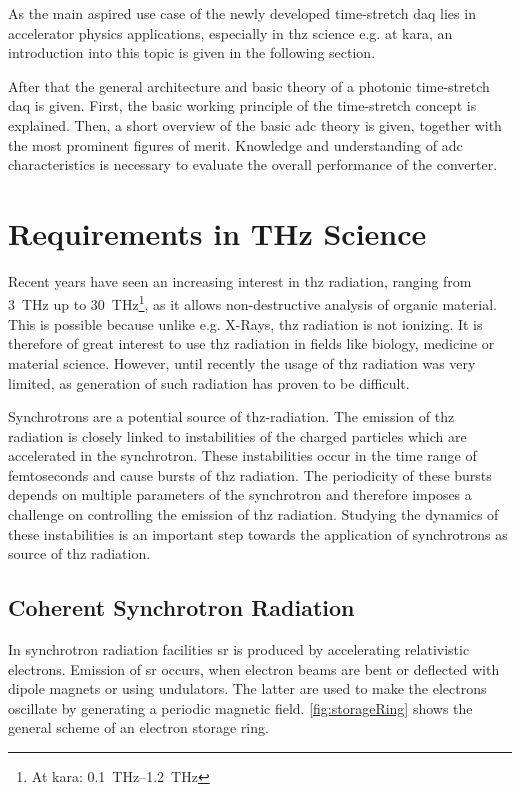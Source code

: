 As the main aspired use case of the newly developed time-stretch \gls{daq} lies in accelerator physics applications, especially in \gls{thz} science e.g. at \gls{kara}, an introduction into this topic is given in the following section. 

After that the general architecture and basic theory of a photonic time-stretch \gls{daq} is given.
First, the basic working principle of the time-stretch concept is explained.
Then, a short overview of the basic \gls{adc} theory is given, together with the most prominent figures of merit. 
Knowledge and understanding of \gls{adc} characteristics is necessary to evaluate the overall performance of the converter. 

\section{Requirements in THz Science}
Recent years have seen an increasing interest in \gls{thz} radiation, ranging from \SI{3}{\tera \hertz} up to \SI{30}{\tera \hertz}\footnote{At \gls{kara}: \SIrange{0.1}{1.2}{\tera \hertz}}, as it allows non-destructive analysis of organic material. 
This is possible because unlike e.g. X-Rays, \gls{thz} radiation is not ionizing.
It is therefore of great interest to use \gls{thz} radiation in fields like biology, medicine or material science.
However, until recently the usage of \gls{thz} radiation was very limited, as generation of such radiation has proven to be difficult.

Synchrotrons are a potential source of \gls{thz}-radiation. %
The emission of \gls{thz} radiation is closely linked to instabilities of the charged particles which are accelerated in the synchrotron. \cite{mueller2012}
These instabilities occur in the time range of femtoseconds and cause bursts of \gls{thz} radiation.
The periodicity of these bursts depends on multiple parameters of the synchrotron and therefore imposes a challenge on controlling the emission of \gls{thz} radiation.
Studying the dynamics of these instabilities is an important step towards the application of synchrotrons as source of \gls{thz} radiation. \cite{rota2018}



\subsection{Coherent Synchrotron Radiation}
In synchrotron radiation facilities \gls{sr} is produced by accelerating relativistic electrons.
Emission of \gls{sr} occurs, when electron beams are bent or deflected with dipole magnets or using undulators. The latter are used to make the electrons oscillate by generating a periodic magnetic field.  
\autoref{fig:storageRing} shows the general scheme of an electron storage ring.

